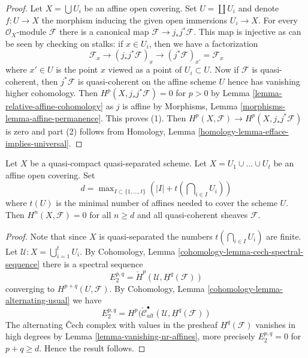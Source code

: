 \begin{proof}
Let $X = \bigcup U_i$ be an affine open covering.
Set $U = \coprod U_i$ and denote $f : U \to X$
the morphism inducing the given open immersions $U_i \to X$.
For every $\mathcal{O}_X$-module $\mathcal{F}$ there is
a canonical map $\mathcal{F} \to j_*j^*\mathcal{F}$.
This map is injective as can be seen by checking on stalks:
if $x \in U_i$, then we have a factorization
$$
\mathcal{F}_x \to (j_*j^*\mathcal{F})_x
\to (j^*\mathcal{F})_{x'} = \mathcal{F}_x
$$
where $x' \in U$ is the point $x$ viewed as a point of $U_i \subset U$.
Now if $\mathcal{F}$ is quasi-coherent, then $j^*\mathcal{F}$
is quasi-coherent on the affine scheme $U$ hence has vanishing
higher cohomology. Then $H^p(X, j_*j^*\mathcal{F}) = 0$ for
$p > 0$ by Lemma \ref{lemma-relative-affine-cohomology} as $j$ is affine by
Morphisms, Lemma \ref{morphisms-lemma-affine-permanence}.
This proves (1).
Then $H^p(X, \mathcal{F}) \to H^p(X, j_*j^*\mathcal{F})$
is zero and part (2) follows from
Homology, Lemma \ref{homology-lemma-efface-implies-universal}.
\end{proof}

\begin{lemma}
\label{lemma-vanishing-nr-affines-quasi-separated}
Let $X$ be a quasi-compact quasi-separated scheme.
Let $X = U_1 \cup \ldots \cup U_t$ be an affine open covering.
Set
$$
d = \max\nolimits_{I \subset \{1, \ldots, t\}}
\left(|I| + t(\bigcap\nolimits_{i \in I} U_i)\right)
$$
where $t(U)$ is the minimal number of affines needed to cover
the scheme $U$. Then $H^n(X, \mathcal{F}) = 0$ for all $n \geq d$ and all
quasi-coherent sheaves $\mathcal{F}$.
\end{lemma}

\begin{proof}
Note that since $X$ is quasi-separated the numbers
$t(\bigcap_{i \in I} U_i)$ are finite.
Let $\mathcal{U} : X = \bigcup_{i = 1}^t U_i$.
By
Cohomology, Lemma \ref{cohomology-lemma-cech-spectral-sequence}
there is a spectral sequence
$$
E_2^{p, q} = \check{H}^p(\mathcal{U}, \underline{H}^q(\mathcal{F}))
$$
converging to $H^{p + q}(U, \mathcal{F})$. By
Cohomology, Lemma \ref{cohomology-lemma-alternating-usual}
we have
$$
E_2^{p, q} =
H^p(\check{\mathcal{C}}_{alt}^\bullet(
\mathcal{U}, \underline{H}^q(\mathcal{F}))
$$
The alternating {\v C}ech complex with values in the presheaf
$\underline{H}^q(\mathcal{F})$ vanishes in high degrees by
Lemma \ref{lemma-vanishing-nr-affines},
more precisely $E_2^{p, q} = 0$ for $p + q \geq d$.
Hence the result follows.
\end{proof}

